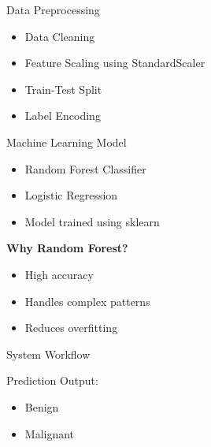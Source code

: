 \documentclass{beamer}
\begin{document}

\begin{frame}{Data Preprocessing}
\begin{itemize}
\item Data Cleaning
\item Feature Scaling using StandardScaler
\item Train-Test Split
\item Label Encoding
\end{itemize}
\end{frame}


\begin{frame}{Machine Learning Model}
\begin{itemize}
\item Random Forest Classifier
\item Logistic Regression
\item Model trained using sklearn
\end{itemize}

\vspace{0.5cm}

\textbf{Why Random Forest?}
\begin{itemize}
\item High accuracy
\item Handles complex patterns
\item Reduces overfitting
\end{itemize}
\end{frame}


\begin{frame}{System Workflow}
\centering


\vspace{0.7cm}

Prediction Output:
\begin{itemize}
\item Benign
\item Malignant
\end{itemize}

\end{frame}
\end{document}
